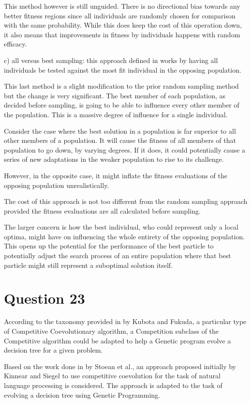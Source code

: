 \documentclass[12pt]{article}
\begin{document}
	This method however is still unguided. There is no directional bias towards any better fitness regions since all individuals are randomly chosen for comparison with the same probability. While this does keep the cost of this operation down, it also means that improvements in fitness by individuals happens with random efficacy.

	c) all versus best sampling: this approach defined in \cite{Sims1994} works by having all individuals be tested against the most fit individual in the opposing population.

	This last method is a slight modification to the prior random sampling method but the change is very significant. The best member of each population, as decided before sampling, is going to be able to influence every other member of the population. This is a massive degree of influence for a single individual. 

	Consider the case where the best solution in a population is far superior to all other members of a population. It will cause the fitness of all members of that population to go down, by varying degrees. If it does, it could potentially cause a series of new adaptations in the weaker population to rise to its challenge. 

	However, in the opposite case, it might inflate the fitness evaluations of the opposing population unrealistically.

	The cost of this approach is not too different from the random sampling approach provided the fitness evaluations are all calculated before sampling.

	The larger concern is how the best individual, who could represent only a local optima, might have on influencing the whole entirety of the opposing population. This opens up the potential for the performance of the best particle to potentially adjust the search process of an entire population where that best particle might still represent a suboptimal solution itself.
\section{Question 23}
According to the taxonomy provided in \cite{Fukuda1998} by Kubota and Fukuda, a particular type of Competitive Coevolutionary algorithm, a Competition subclass of the Competitive algorithm could be adapted to help a Genetic program evolve a decision tree for a given problem.	

Based on the work done in \cite{stoean2006} by Stoean et al.,  an approach proposed initially by Kinnear and Siegel \cite{kinnear1994} to use competitive coevolution for the task of natural language processing is considered. The approach is adapted to the task of evolving a decision tree using Genetic Programming.
\end{document}
